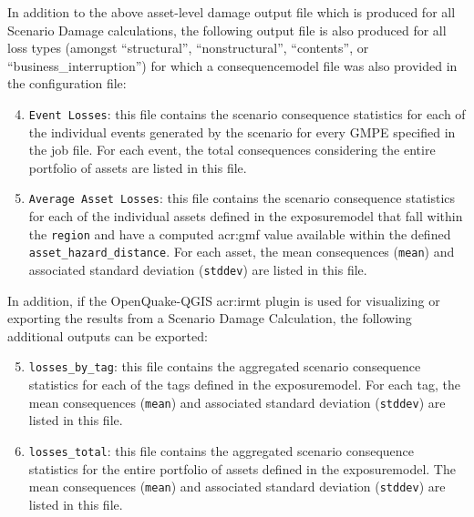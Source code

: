 In addition to the above asset-level damage output file which is
produced for all Scenario Damage calculations, the following output file is
also produced for all loss types
(amongst ``structural'', ``nonstructural'', ``contents'', or
``business\_interruption'') for which a \gls{consequencemodel} file was also
provided in the configuration file:

\begin{enumerate}
\setcounter{enumi}{3}

  \item \Verb+Event Losses+: this file contains the scenario consequence
    statistics for each of the individual \glspl{event} generated by the 
    scenario for every GMPE specified in the job file. For each \gls{event}, 
    the total consequences considering the entire portfolio of \glspl{asset}
    are listed in this file.

  \item \Verb+Average Asset Losses+: this file contains the scenario consequence
    statistics for each of the individual \glspl{asset} defined in the
    \gls{exposuremodel} that fall within the \Verb+region+ and have
    a computed \gls{acr:gmf} value available within the defined
    \Verb+asset_hazard_distance+. For each \gls{asset}, the mean consequences
    (\Verb+mean+) and associated standard deviation (\Verb+stddev+) are listed
    in this file.

\end{enumerate}

In addition, if the OpenQuake-QGIS \gls{acr:irmt} plugin is used for
visualizing or exporting the results from a Scenario Damage Calculation, the
following additional outputs can be exported:

\begin{enumerate}
\setcounter{enumi}{4}

  \item \Verb+losses_by_tag+: this file contains the aggregated scenario
    consequence statistics for each of the \glspl{tag} defined in the
    \gls{exposuremodel}. For each \gls{tag}, the mean consequences
    (\Verb+mean+) and associated standard deviation (\Verb+stddev+) are listed
    in this file.

  \item \Verb+losses_total+: this file contains the aggregated scenario
    consequence statistics for the entire portfolio of \glspl{asset} defined
    in the \gls{exposuremodel}. The mean consequences (\Verb+mean+) and 
    associated standard deviation (\Verb+stddev+) are listed in this file.

\end{enumerate}


